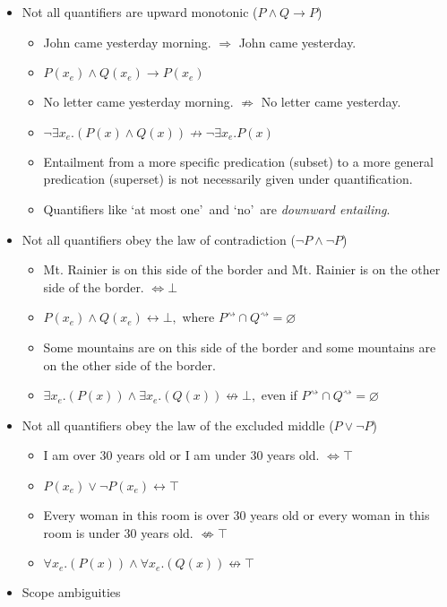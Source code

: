 \documentclass[a4paper]{article}
\begin{document}
\begin{itemize}
	\item Not all quantifiers are upward monotonic ($P \land Q \rightarrow P$)
	\begin{itemize}
		\item John came yesterday morning. $\Rightarrow$ John came yesterday.
		\item $P(x_e) \land Q(x_e) \rightarrow P(x_e)$
		\item No letter came yesterday morning. $\not\Rightarrow$ No letter came yesterday.
		\item $\neg\exists x_e.(P(x) \land Q(x)) \not\rightarrow \neg\exists x_e.P(x)$
		\item Entailment from a more specific predication (subset) to a more general predication (superset) is not necessarily given under quantification.
		\item Quantifiers like \lq at most one\rq\ and \lq no\rq\ are \emph{downward entailing}.
	\end{itemize}

	\item Not all quantifiers obey the law of contradiction ($\neg P \land \neg P$)
	\begin{itemize}
		\item Mt. Rainier is on this side of the border and Mt. Rainier is on the other side of the border. $\Leftrightarrow \bot$
		\item $P(x_e) \land Q(x_e) \leftrightarrow \bot,$ where $P^\rightsquigarrow \cap Q^\rightsquigarrow = \varnothing$
		\item Some mountains are on this side of the border and some mountains are on the other side of the border.
		\item $\exists x_e.(P(x)) \land \exists x_e.(Q(x)) \not \leftrightarrow \bot,$ even if $P^\rightsquigarrow \cap Q^\rightsquigarrow = \varnothing$
	\end{itemize}

	\item Not all quantifiers obey the law of the excluded middle ($P \lor \neg P$)

	\begin{itemize}
		\item I am over 30 years old or I am under 30 years old. $\Leftrightarrow \top$
		\item $P(x_e) \lor \neg P(x_e) \leftrightarrow \top$
		\item Every woman in this room is over 30 years old or every woman in this room is under 30 years old. $\not \Leftrightarrow \top$
		\item $\forall x_e.(P(x)) \land \forall x_e.(Q(x)) \not\leftrightarrow \top$
	\end{itemize}

	\item Scope ambiguities
\end{itemize}
\end{document}
